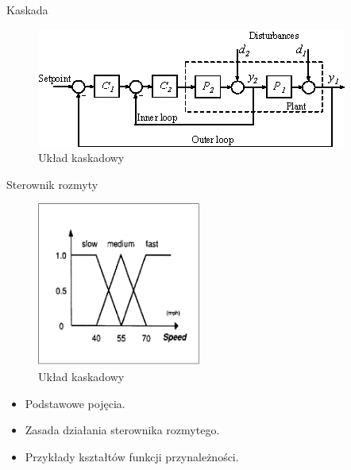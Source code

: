 	\begin{frame}{Kaskada}
    	\begin{figure}[!htp]
    		\centering
    		\includegraphics[width=\textwidth]{img/kaskada}
    		\caption{Układ kaskadowy}
    	\end{figure}
	\end{frame}
	
	\begin{frame}[t]{Sterownik rozmyty}
		\only<1>
		{
    		\begin{figure}[!htp]
    			\centering
    			\includegraphics[width=0.48\textwidth]{img/fuzzy}
    			\caption{Układ kaskadowy}
    		\end{figure}
    	}
    	{
    		\begin{itemize}
    			\item Podstawowe pojęcia. 
    			  \pause
    			\item Zasada działania sterownika rozmytego. 
    			  \pause
    			\item Przykłady kształtów funkcji przynależności.
    		\end{itemize}
    	}
	\end{frame}
  
